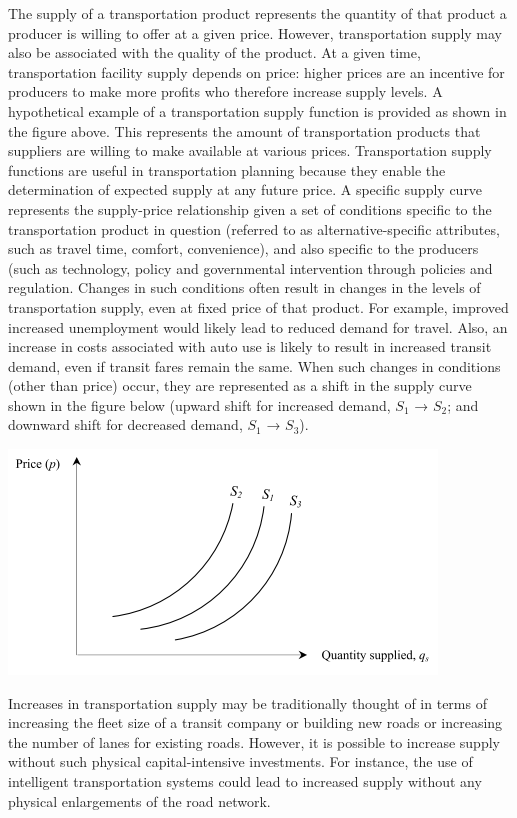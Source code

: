 The supply of a transportation product represents the quantity of that product a producer is willing to offer at a given price. However, transportation supply may also be associated with the quality of the product. At a given time, transportation facility supply depends on price: higher prices are an incentive for producers to make more profits who therefore increase supply levels. A hypothetical example of a transportation supply function is provided as shown in the figure above. This represents the amount of transportation products that suppliers are willing to make available at various prices. Transportation supply functions are useful in transportation planning because they enable the determination of expected supply at any future price. A specific supply curve represents the supply-price relationship given a set of conditions specific to the transportation product in question (referred to as alternative-specific attributes, such as travel time, comfort, convenience), and also specific to the producers (such as technology, policy and governmental intervention through policies and regulation. Changes in such conditions often result in changes in the levels of transportation supply, even at fixed price of that product. For example, improved increased unemployment would likely lead to reduced demand for travel. Also, an increase in costs associated with auto use is likely to result in increased transit demand, even if transit fares remain the same. When such changes in conditions (other than price) occur, they are represented as a shift in the supply curve shown in the figure below (upward shift for increased demand, $ S_1 $ → $ S_2 $; and downward shift for decreased demand, $ S_1 $ → $ S_3 $).
\begin{center}
	\includegraphics{gfx/fig43.png}
\end{center}
Increases in transportation supply may be traditionally thought of in terms of increasing the fleet size of a transit company or building new roads or increasing the number of lanes for existing roads. However, it is possible to increase supply without such physical capital-intensive investments. For instance, the use of intelligent transportation systems could lead to increased supply without any physical enlargements of the road network.
